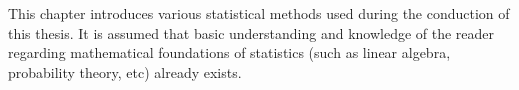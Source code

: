 
This chapter introduces various statistical methods used during the conduction of this thesis. It is assumed that basic understanding and knowledge of the reader regarding mathematical foundations of statistics (such as linear algebra, probability theory, etc) already exists.